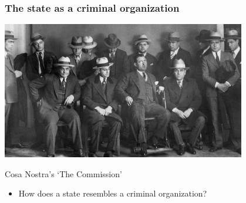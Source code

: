 \documentclass[aspectratio=43, handout]{beamer}
\begin{document}
\begin{frame}
\frametitle{The state as a criminal organization}
\centering

\includegraphics[width = 0.8\textwidth]{img/cosa_nostra}

{\small Cosa Nostra's `The Commission'}

\vspace{20pt}

\begin{itemize}
  \item How does a state resembles a criminal organization?
\end{itemize}

\end{frame}
\end{document}
